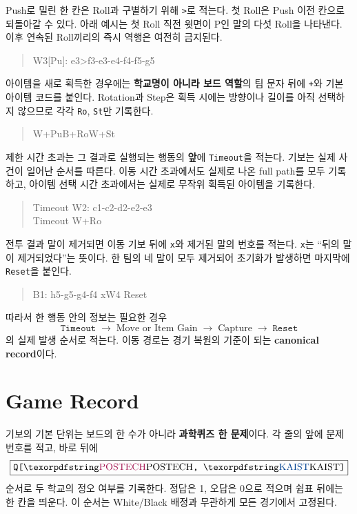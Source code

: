 Push로 밀린 한 칸은 Roll과 구별하기 위해 \texttt{>}로 적는다. 첫 Roll은 Push 이전 칸으로 되돌아갈 수 있다. 아래 예시는 첫 Roll 직전 윗면이 P인 말의 다섯 Roll을 나타낸다. 이후 연속된 Roll끼리의 즉시 역행은 여전히 금지된다.
\begin{quote}\ttfamily W3[Pu]: e3>f3-e3-e4-f4-f5-g5\end{quote}

아이템을 새로 획득한 경우에는 \textbf{학교명이 아니라 보드 역할}의 팀 문자 뒤에 \texttt{+}와 기본 아이템 코드를 붙인다. Rotation과 Step은 획득 시에는 방향이나 길이를 아직 선택하지 않으므로 각각 \texttt{Ro}, \texttt{St}만 기록한다.
\begin{quote}\ttfamily W+Pu\qquad B+Ro\qquad W+St\end{quote}

제한 시간 초과는 그 결과로 실행되는 행동의 \textbf{앞}에 \texttt{Timeout}을 적는다. 기보는 실제 사건이 일어난 순서를 따른다. 이동 시간 초과에서도 실제로 나온 full path를 모두 기록하고, 아이템 선택 시간 초과에서는 실제로 무작위 획득된 아이템을 기록한다.
\begin{quote}\ttfamily
Timeout W2: c1-c2-d2-e2-e3\\
Timeout W+Ro
\end{quote}

전투 결과 말이 제거되면 이동 기보 뒤에 \texttt{x}와 제거된 말의 번호를 적는다. \texttt{x}는 ``뒤의 말이 제거되었다''는 뜻이다. 한 팀의 네 말이 모두 제거되어 초기화가 발생하면 마지막에 \texttt{Reset}을 붙인다.
\begin{quote}\ttfamily B1: h5-g5-g4-f4 xW4 Reset\end{quote}

따라서 한 행동 안의 정보는 필요한 경우
\[\texttt{Timeout}\;\longrightarrow\;\text{Move or Item Gain}\;\longrightarrow\;\text{Capture}\;\longrightarrow\;\texttt{Reset}\]
의 실제 발생 순서로 적는다. 이동 경로는 경기 복원의 기준이 되는 \textbf{canonical record}이다.

\section{Game Record}

기보의 기본 단위는 보드의 한 수가 아니라 \textbf{과학퀴즈 한 문제}이다. 각 줄의 앞에 문제 번호를 적고, 바로 뒤에
\[
\boxed{\text{\texttt{Q[}\POSTECH\texttt{, }\KAIST\texttt{]}}}
\]
순서로 두 학교의 정오 여부를 기록한다. 정답은 1, 오답은 0으로 적으며 쉼표 뒤에는 한 칸을 띄운다. 이 순서는 White/Black 배정과 무관하게 모든 경기에서 고정된다.

